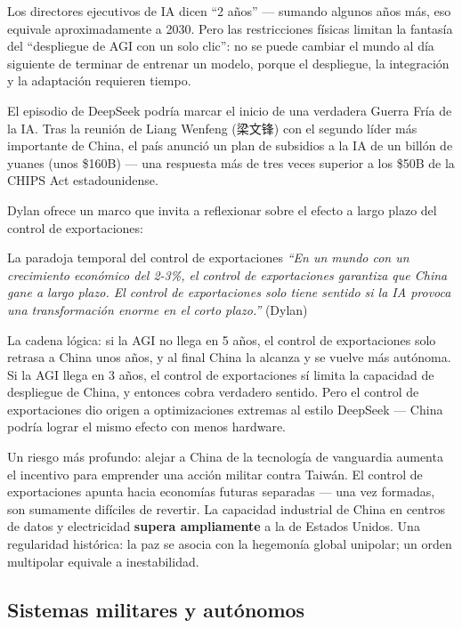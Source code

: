 Los directores ejecutivos de IA dicen ``2 años'' — sumando algunos años más, eso equivale aproximadamente a 2030. Pero las restricciones físicas limitan la fantasía del ``despliegue de AGI con un solo clic'': no se puede cambiar el mundo al día siguiente de terminar de entrenar un modelo, porque el despliegue, la integración y la adaptación requieren tiempo.

El episodio de DeepSeek podría marcar el inicio de una verdadera Guerra Fría de la IA. Tras la reunión de Liang Wenfeng (梁文锋) con el segundo líder más importante de China, el país anunció un plan de subsidios a la IA de un billón de yuanes (unos \$160B) — una respuesta más de tres veces superior a los \$50B de la CHIPS Act estadounidense.

Dylan ofrece un marco que invita a reflexionar sobre el efecto a largo plazo del control de exportaciones:

\begin{warningbox}{La paradoja temporal del control de exportaciones}
\textit{``En un mundo con un crecimiento económico del 2-3\%, el control de exportaciones garantiza que China gane a largo plazo. El control de exportaciones solo tiene sentido si la IA provoca una transformación enorme en el corto plazo.''} (Dylan)

La cadena lógica: si la AGI no llega en 5 años, el control de exportaciones solo retrasa a China unos años, y al final China la alcanza y se vuelve más autónoma. Si la AGI llega en 3 años, el control de exportaciones sí limita la capacidad de despliegue de China, y entonces cobra verdadero sentido. Pero el control de exportaciones dio origen a optimizaciones extremas al estilo DeepSeek — China podría lograr el mismo efecto con menos hardware.

Un riesgo más profundo: alejar a China de la tecnología de vanguardia aumenta el incentivo para emprender una acción militar contra Taiwán. El control de exportaciones apunta hacia economías futuras separadas — una vez formadas, son sumamente difíciles de revertir. La capacidad industrial de China en centros de datos y electricidad \textbf{supera ampliamente} a la de Estados Unidos. Una regularidad histórica: la paz se asocia con la hegemonía global unipolar; un orden multipolar equivale a inestabilidad.
\end{warningbox}

\subsection{Sistemas militares y autónomos}

